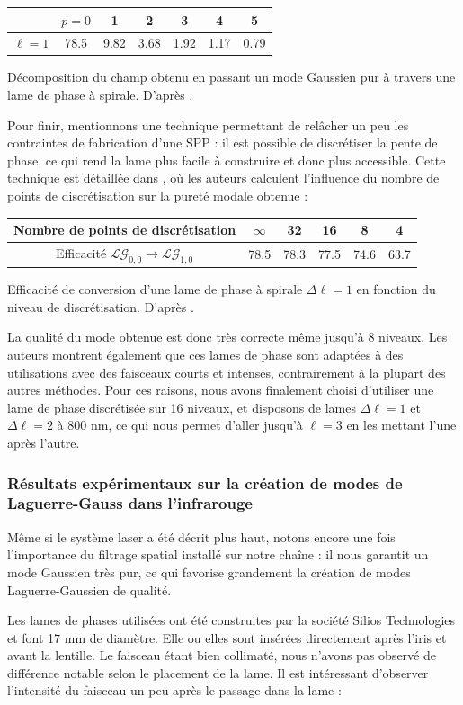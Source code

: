 \begin{center}
  \begin{tabular}{ c | c | c | c | c | c | c }
    \hline
		& $p = 0$ & 1 & 2 & 3 & 4 & 5 \\ \hline
    $\ell=1$ & 78.5 & 9.82 & 3.68 & 1.92 & 1.17 & 0.79 \\ \hline
  \end{tabular}
	\caption{Décomposition du champ obtenu en passant un mode Gaussien pur à travers une lame de phase à spirale. D'après .}
	\label{Tab:DecompBei}
\end{center}
Pour finir, mentionnons une technique permettant de relâcher un peu les contraintes de fabrication d'une SPP : il est possible de discrétiser la pente de phase, ce qui rend la lame plus facile à construire et donc plus accessible. Cette technique est détaillée dans , où les auteurs calculent l'influence du nombre de points de discrétisation sur la pureté modale obtenue :
\begin{center}
  \begin{tabular}{c | c | c | c | c | c}
    \hline
		Nombre de points de discrétisation & $\infty$ & 32 & 16 & 8 & 4 \\ \hline
    Efficacité $\mathcal{LG}_{0,0}\rightarrow\mathcal{LG}_{1,0}$ & 78.5 & 78.3 & 77.5 & 74.6 & 63.7 \\ \hline
  \end{tabular}
	\caption{Efficacité de conversion d'une lame de phase à spirale $\Delta\ell=1$ en fonction du niveau de discrétisation. D'après .}
	\label{Tab:DecompSueda}
\end{center}
La qualité du mode obtenue est donc très correcte même jusqu'à 8 niveaux. Les auteurs montrent également que ces lames de phase sont adaptées à des utilisations avec des faisceaux courts et intenses, contrairement à la plupart des autres méthodes. Pour ces raisons, nous avons finalement choisi d'utiliser une lame de phase discrétisée sur 16 niveaux, et disposons de lames $\Delta\ell = 1$ et $\Delta\ell = 2$ à 800 nm, ce qui nous permet d'aller jusqu’à $\ell = 3$ en les mettant l'une après l'autre.

\subsubsection{Résultats expérimentaux sur la création de modes de Laguerre-Gauss dans l'infrarouge}
\label{sec:spp}
Même si le système laser a été décrit plus haut, notons encore une fois l'importance du filtrage spatial installé sur notre chaîne : il nous garantit un mode Gaussien très pur, ce qui favorise grandement la création de modes Laguerre-Gaussien de qualité. \par
Les lames de phases utilisées ont été construites par la société Silios Technologies et font 17 mm de diamètre. Elle ou elles sont insérées directement après l'iris et avant la lentille. Le faisceau étant bien collimaté, nous n'avons pas observé de différence notable selon le placement de la lame. Il est intéressant d'observer l'intensité du faisceau un peu après le passage dans la lame : 

